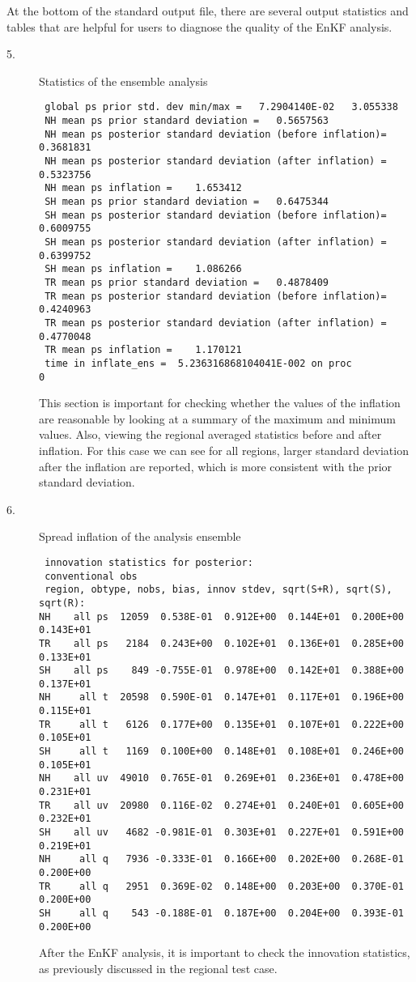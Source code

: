At the bottom of the standard output file, there are several output statistics and tables that are helpful for users to diagnose the quality of the EnKF analysis.
\begin{description}
\item[5.] Statistics of the ensemble analysis
\begin{footnotesize}
\begin{verbatim}
 global ps prior std. dev min/max =   7.2904140E-02   3.055338
 NH mean ps prior standard deviation =   0.5657563
 NH mean ps posterior standard deviation (before inflation)=   0.3681831
 NH mean ps posterior standard deviation (after inflation) =   0.5323756
 NH mean ps inflation =    1.653412
 SH mean ps prior standard deviation =   0.6475344
 SH mean ps posterior standard deviation (before inflation)=   0.6009755
 SH mean ps posterior standard deviation (after inflation) =   0.6399752
 SH mean ps inflation =    1.086266
 TR mean ps prior standard deviation =   0.4878409
 TR mean ps posterior standard deviation (before inflation)=   0.4240963
 TR mean ps posterior standard deviation (after inflation) =   0.4770048
 TR mean ps inflation =    1.170121
 time in inflate_ens =  5.236316868104041E-002 on proc           0
\end{verbatim}
\end{footnotesize}
This section is important for checking whether the values of the inflation are reasonable by looking at a summary of the maximum and minimum values. Also, viewing the regional averaged statistics before and after inflation. For this case we can see for all regions, larger standard deviation after the inflation are reported, which is more consistent with the prior standard deviation.\\

\item[6.] Spread inflation of the analysis ensemble
\begin{footnotesize}
\begin{verbatim}
 innovation statistics for posterior:
 conventional obs
 region, obtype, nobs, bias, innov stdev, sqrt(S+R), sqrt(S), sqrt(R):
NH    all ps  12059  0.538E-01  0.912E+00  0.144E+01  0.200E+00  0.143E+01
TR    all ps   2184  0.243E+00  0.102E+01  0.136E+01  0.285E+00  0.133E+01
SH    all ps    849 -0.755E-01  0.978E+00  0.142E+01  0.388E+00  0.137E+01
NH     all t  20598  0.590E-01  0.147E+01  0.117E+01  0.196E+00  0.115E+01
TR     all t   6126  0.177E+00  0.135E+01  0.107E+01  0.222E+00  0.105E+01
SH     all t   1169  0.100E+00  0.148E+01  0.108E+01  0.246E+00  0.105E+01
NH    all uv  49010  0.765E-01  0.269E+01  0.236E+01  0.478E+00  0.231E+01
TR    all uv  20980  0.116E-02  0.274E+01  0.240E+01  0.605E+00  0.232E+01
SH    all uv   4682 -0.981E-01  0.303E+01  0.227E+01  0.591E+00  0.219E+01
NH     all q   7936 -0.333E-01  0.166E+00  0.202E+00  0.268E-01  0.200E+00
TR     all q   2951  0.369E-02  0.148E+00  0.203E+00  0.370E-01  0.200E+00
SH     all q    543 -0.188E-01  0.187E+00  0.204E+00  0.393E-01  0.200E+00
\end{verbatim}
\end{footnotesize}
After the EnKF analysis, it is important to check the innovation statistics, as previously discussed in the regional test case.
\end{description}
